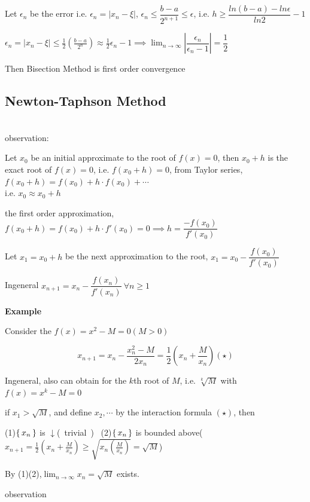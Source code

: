 Let $\epsilon_n$ be the error i.e. $\epsilon_n = |x_n - \xi|$, $\epsilon_n \leq \dfrac{b-a}{2^{n+1}} \leq \epsilon$, i.e. $h \geq \dfrac{ln(b-a) - ln\epsilon}{ln2}-1$

$\epsilon_n = |x_n - \xi| \leq \frac{1}{2}(\frac{b-a}{2^n}) \approx \frac{1}{2}\epsilon_n - 1 \implies \lim_{n \rightarrow \infty}|\dfrac{\epsilon_n}{\epsilon_n - 1}| = \dfrac{1}{2}$

Then Bisection Method is first order convergence

\subsection{Newton-Taphson Method}$ $\\


observation:

Let $x_0$ be an initial approximate to the root of $f(x) = 0$, then $x_0 + h$ is the exact root of $f(x)=0$, i.e. $f(x_0 + h) = 0$, from Taylor series, $f(x_0+h) = f(x_0)+h\cdot f(x_0)+\cdots$\\i.e. $x_0 \approx x_0 + h$

the first order approximation, $f(x_0+h) = f(x_0)+h\cdot f'(x_0)=0 \implies h=\dfrac{-f(x_0)}{f'(x_0)}$

Let $x_1 = x_0 + h$ be the next approximation to the root, $x_1 = x_0 - \dfrac{f(x_0)}{f'(x_0)}$

Ingeneral $x_{n+1} = x_n - \dfrac{f(x_n)}{f'(x_n)} ~\forall n \geq 1$

\textbf{Example}

\begin{tcolorbox}
	

Consider the $f(x) = x^2-M=0(M>0)$

$$x_{n+1} = x_n - \dfrac{x_n^2-M}{2x_n} = \frac{1}{2}(x_n + \frac{M}{x_n})(\star)$$

Ingeneral, also can obtain for the $k$th root of $M$, i.e. $\sqrt[k]{M}$ with $f(x) = x^k - M = 0$

if $x_1 > \sqrt{M}$, and define $x_2,\cdots$ by the interaction formula $(\star)$, then 

(1)$\left\{ \,x_n \,\right\}$ is $\downarrow$(~trivial~)  ~(2)$\left\{ \,x_n \,\right\}$ is bounded above($x_{n+1} = \frac{1}{2}(x_n + \frac{M}{x_n}) \geq \sqrt{x_n(\frac{M}{x_n})} = \sqrt{M}$)

By (1)(2),$\lim_{n\rightarrow \infty}x_n = \sqrt{M}$ exists.

\end{tcolorbox}


observation 

